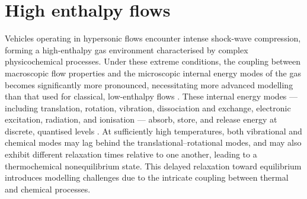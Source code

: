 




\section{High enthalpy flows}
Vehicles operating in hypersonic flows encounter intense shock-wave compression, forming a high-enthalpy gas environment characterised by complex physicochemical processes. Under these extreme conditions, the coupling between macroscopic flow properties and the microscopic internal energy modes of the gas becomes significantly more pronounced, necessitating more advanced modelling than that used for classical, low-enthalpy flows \citep{Candler2019}. These internal energy modes — including translation, rotation, vibration, dissociation and exchange, electronic excitation, radiation, and ionisation — absorb, store, and release energy at discrete, quantised levels \cite[ch.~11]{Anderson2019}. At sufficiently high temperatures, both vibrational and chemical modes may lag behind the translational–rotational modes, and may also exhibit different relaxation times relative to one another, leading to a thermochemical nonequilibrium state. This delayed relaxation toward equilibrium introduces modelling challenges due to the intricate coupling between thermal and chemical processes.

